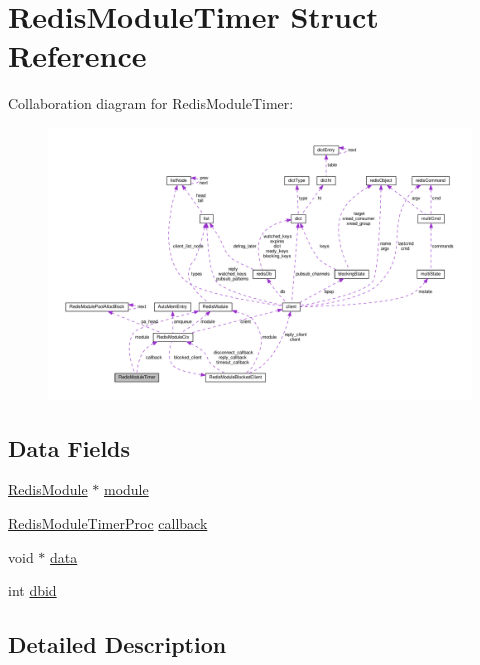 \hypertarget{struct_redis_module_timer}{}\section{Redis\+Module\+Timer Struct Reference}
\label{struct_redis_module_timer}


Collaboration diagram for Redis\+Module\+Timer\+:
\nopagebreak
\begin{figure}[H]
\begin{center}
\leavevmode
\includegraphics[width=350pt]{struct_redis_module_timer__coll__graph}
\end{center}
\end{figure}
\subsection*{Data Fields}
\begin{DoxyCompactItemize}
\item 
\hyperlink{struct_redis_module}{Redis\+Module} $\ast$ \hyperlink{struct_redis_module_timer_a9b71e67bccc12e40caf1d263db4172f3}{module}
\item 
\hyperlink{redismodule_8h_adf768345baf4782f6d47492ce4704a2a}{Redis\+Module\+Timer\+Proc} \hyperlink{struct_redis_module_timer_a41274c33dd37a5b379e6a81a44f924a6}{callback}
\item 
void $\ast$ \hyperlink{struct_redis_module_timer_a735984d41155bc1032e09bece8f8d66d}{data}
\item 
int \hyperlink{struct_redis_module_timer_adc62368127157e2b3ff9cabe77f4f337}{dbid}
\end{DoxyCompactItemize}


\subsection{Detailed Description}



